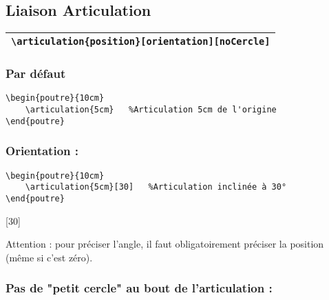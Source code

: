\documentclass[a4paper,10pt]{article}
\begin{document}
	
	
    
    \subsection{Liaison Articulation}
	
	\begin{center}
        \begin{tabular}{|c|}
            \hline
            \verb!\articulation{position}[orientation][noCercle]!
            \\\hline
        \end{tabular}
    \end{center}
	
	
        \subsubsection{Par défaut}
	
        \begin{verbatim}
\begin{poutre}{10cm}
    \articulation{5cm}   %Articulation 5cm de l'origine
\end{poutre}
        \end{verbatim}

\begin{poutre}{10cm}
    \articulation{5cm}   %
\end{poutre}


        \subsubsection{Orientation :}
	
        \begin{verbatim}
\begin{poutre}{10cm}
    \articulation{5cm}[30]   %Articulation inclinée à 30°
\end{poutre}
        \end{verbatim}

\begin{poutre}{10cm}
    \articulation{5cm}[30]   %
\end{poutre}

    Attention : pour préciser l'angle, il faut obligatoirement préciser la position (même si c'est zéro).
    
    
        \subsubsection{Pas de "petit cercle" au bout de l'articulation :}
	
\end{document}
